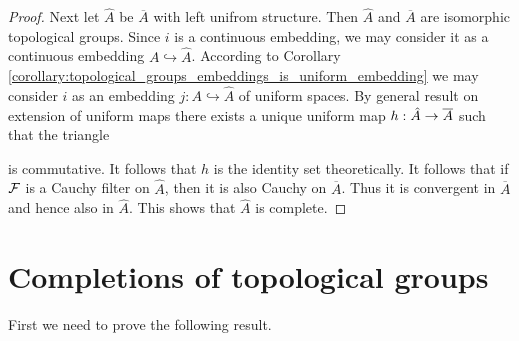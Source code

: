 \documentclass[10pt]{amsart}
\begin{document}
\begin{proof}
	Next let $\hat{A}$ be $\overline{A}$ with left unifrom structure. Then $\hat{A}$ and $\overline{A}$ are isomorphic topological groups. Since $i$ is a continuous embedding, we may consider it as a continuous embedding $A\hookrightarrow \hat{A}$. According to Corollary \ref{corollary:topological_groups_embeddings_is_uniform_embedding} we may consider $i$ as an embedding $j:A\hookrightarrow \hat{A}$ of uniform spaces. By general result on extension of uniform maps there exists a unique uniform map $h:\hat{A}\rightarrow \overline{A}$ such that the triangle
	\begin{center}
	\end{center}
	is commutative. It follows that $h$ is the identity set theoretically. It follows that if ${\mathcal F}$ is a Cauchy filter on $\hat{A}$, then it is also Cauchy on $\overline{A}$. Thus it is convergent in $\overline{A}$ and hence also in $\hat{A}$. This shows that $\hat{A}$ is complete.
\end{proof}


\section{Completions of topological groups}
\noindent
First we need to prove the following result.
\end{document}
